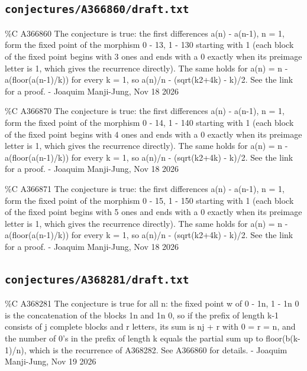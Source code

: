 \subsection*{\texttt{conjectures/A366860/draft.txt}}
{\small\raggedright\ttfamily
\%C A366860 The conjecture is true: the first differences a(n) - a(n-1), n = 1, form the fixed point of the morphism 0 - 13, 1 - 130 starting with 1 (each block of the fixed point begins with 3 ones and ends with a 0 exactly when its preimage letter is 1, which gives the recurrence directly). The same holds for a(n) = n - a(floor(a(n-1)/k)) for every k = 1, so a(n)/n - (sqrt(k2+4k) - k)/2. See the link for a proof. - Joaquim Manji-Jung, Nov 18 2026\par
\par
\%C A366870 The conjecture is true: the first differences a(n) - a(n-1), n = 1, form the fixed point of the morphism 0 - 14, 1 - 140 starting with 1 (each block of the fixed point begins with 4 ones and ends with a 0 exactly when its preimage letter is 1, which gives the recurrence directly). The same holds for a(n) = n - a(floor(a(n-1)/k)) for every k = 1, so a(n)/n - (sqrt(k2+4k) - k)/2. See the link for a proof. - Joaquim Manji-Jung, Nov 18 2026\par
\par
\%C A366871 The conjecture is true: the first differences a(n) - a(n-1), n = 1, form the fixed point of the morphism 0 - 15, 1 - 150 starting with 1 (each block of the fixed point begins with 5 ones and ends with a 0 exactly when its preimage letter is 1, which gives the recurrence directly). The same holds for a(n) = n - a(floor(a(n-1)/k)) for every k = 1, so a(n)/n - (sqrt(k2+4k) - k)/2. See the link for a proof. - Joaquim Manji-Jung, Nov 18 2026\par
}
\subsection*{\texttt{conjectures/A368281/draft.txt}}
{\small\raggedright\ttfamily
\%C A368281 The conjecture is true for all n: the fixed point w of 0 - 1n, 1 - 1n 0 is the concatenation of the blocks 1n and 1n 0, so if the prefix of length k-1 consists of j complete blocks and r letters, its sum is nj + r with 0 = r = n, and the number of 0's in the prefix of length k equals the partial sum up to floor(b(k-1)/n), which is the recurrence of A368282. See A366860 for details. - Joaquim Manji-Jung, Nov 19 2026\par
}
